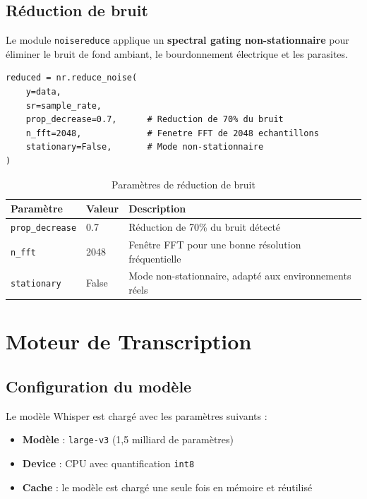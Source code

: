 \documentclass[12pt,a4paper]{report}
\begin{document}
\section{Réduction de bruit}

Le module \texttt{noisereduce} applique un \textbf{spectral gating non-stationnaire} pour éliminer le bruit de fond ambiant, le bourdonnement électrique et les parasites.

\begin{lstlisting}[style=python, title=Configuration de la réduction de bruit]
reduced = nr.reduce_noise(
    y=data,
    sr=sample_rate,
    prop_decrease=0.7,      # Reduction de 70% du bruit
    n_fft=2048,             # Fenetre FFT de 2048 echantillons
    stationary=False,       # Mode non-stationnaire
)
\end{lstlisting}

\begin{table}[H]
    \centering
    \caption{Paramètres de réduction de bruit}
    \label{tab:denoise}
    \begin{tabular}{@{} l l p{7cm} @{}}
        \toprule
        \textbf{Paramètre} & \textbf{Valeur} & \textbf{Description} \\
        \midrule
        \texttt{prop\_decrease} & 0.7 & Réduction de 70\% du bruit détecté \\
        \texttt{n\_fft} & 2048 & Fenêtre FFT pour une bonne résolution fréquentielle \\
        \texttt{stationary} & False & Mode non-stationnaire, adapté aux environnements réels \\
        \bottomrule
    \end{tabular}
\end{table}

\chapter{Moteur de Transcription}

\section{Configuration du modèle}

Le modèle Whisper est chargé avec les paramètres suivants :

\begin{itemize}
    \item \textbf{Modèle} : \texttt{large-v3} (1,5 milliard de paramètres)
    \item \textbf{Device} : CPU avec quantification \texttt{int8}
    \item \textbf{Cache} : le modèle est chargé une seule fois en mémoire et réutilisé
\end{itemize}
\end{document}
